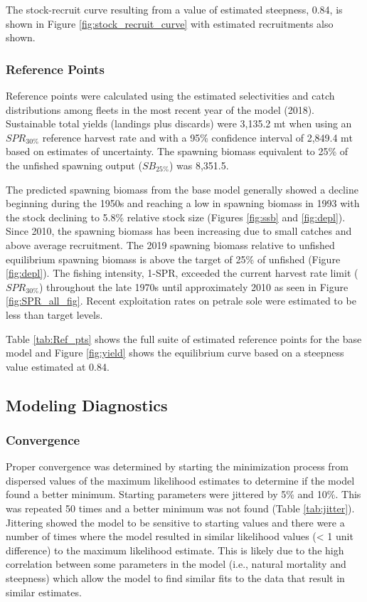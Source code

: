 \documentclass[12pt,]{article}
\begin{document}
The stock-recruit curve resulting from a value of estimated steepness,
0.84, is shown in Figure \ref{fig:stock_recruit_curve} with estimated
recruitments also shown.

\subsubsection{Reference Points}\label{reference-points-1}

Reference points were calculated using the estimated selectivities and
catch distributions among fleets in the most recent year of the model
(2018). Sustainable total yields (landings plus discards) were 3,135.2
mt when using an \(SPR_{30\%}\) reference harvest rate and with a 95\%
confidence interval of 2,849.4 mt based on estimates of uncertainty. The
spawning biomass equivalent to 25\% of the unfished spawning output
(\(SB_{25\%}\)) was 8,351.5.

The predicted spawning biomass from the base model generally showed a
decline beginning during the 1950s and reaching a low in spawning
biomass in 1993 with the stock declining to 5.8\% relative stock size
(Figures \ref{fig:ssb} and \ref{fig:depl}). Since 2010, the spawning
biomass has been increasing due to small catches and above average
recruitment. The 2019 spawning biomass relative to unfished equilibrium
spawning biomass is above the target of 25\% of unfished (Figure
\ref{fig:depl}). The fishing intensity, 1-SPR, exceeded the current
harvest rate limit (\(SPR_{30\%}\)) throughout the late 1970s until
approximately 2010 as seen in Figure \ref{fig:SPR_all_fig}. Recent
exploitation rates on petrale sole were estimated to be less than target
levels.

Table \ref{tab:Ref_pts} shows the full suite of estimated reference
points for the base model and Figure \ref{fig:yield} shows the
equilibrium curve based on a steepness value estimated at 0.84.

\subsection{Modeling Diagnostics}\label{modeling-diagnostics}

\subsubsection{Convergence}\label{convergence}

Proper convergence was determined by starting the minimization process
from dispersed values of the maximum likelihood estimates to determine
if the model found a better minimum. Starting parameters were jittered
by 5\% and 10\%. This was repeated 50 times and a better minimum was not
found (Table \ref{tab:jitter}). Jittering showed the model to be
sensitive to starting values and there were a number of times where the
model resulted in similar likelihood values (\textless{} 1 unit
difference) to the maximum likelihood estimate. This is likely due to
the high correlation between some parameters in the model (i.e., natural
mortality and steepness) which allow the model to find similar fits to
the data that result in similar estimates.
\end{document}
